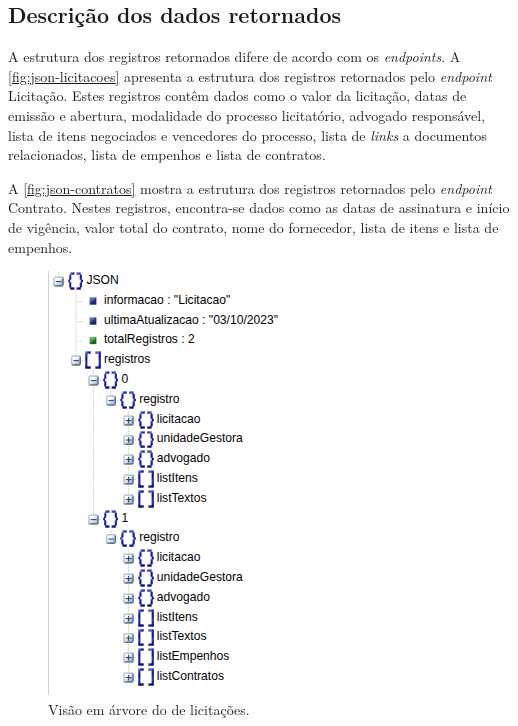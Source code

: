 \documentclass[
	12pt,				%
	oneside,			%
	a4paper,			%
	chapter=TITLE,		%
	section=TITLE,		%
	english,			%
	brazil				%
	]{abntex2}
\begin{document}


\subsection{Descrição dos dados retornados}\label{ssec:descricao_dados}

A estrutura dos registros  retornados difere de acordo com os \textit{endpoints}. A \autoref{fig:json-licitacoes} apresenta a estrutura dos registros retornados pelo \textit{endpoint} Licitação. Estes registros contêm dados como o valor da licitação, datas de emissão e abertura, modalidade do processo licitatório, advogado responsável, lista de itens negociados e vencedores do processo, lista de \textit{links} a documentos relacionados, lista de empenhos e lista de contratos.

A \autoref{fig:json-contratos} mostra a estrutura dos registros retornados pelo \textit{endpoint} Contrato. Nestes registros, encontra-se dados como as datas de assinatura e início de vigência, valor total do contrato, nome do fornecedor, lista de itens e lista de empenhos.


\begin{figure}[htb]
    \centering
    \includegraphics[width=0.36\linewidth]{images/json_licitacao_v2.png}
    \caption{Visão em árvore do  de licitações.}
    \label{fig:json-licitacoes}
\end{figure}
\end{document}
